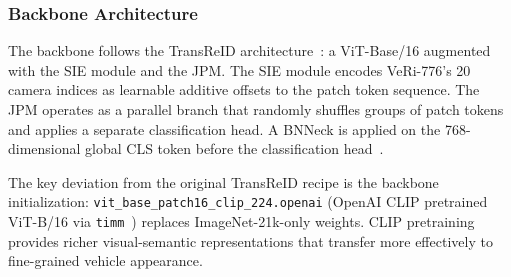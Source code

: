 \documentclass[11pt]{article}
\begin{document}
\subsubsection{Backbone Architecture}
The backbone follows the TransReID architecture~\cite{he2021transreid}: a
ViT-Base/16 augmented with the SIE module and the JPM. The SIE module
encodes VeRi-776's 20 camera indices as learnable additive offsets to the
patch token sequence. The JPM operates as a parallel branch that randomly
shuffles groups of patch tokens and applies a separate classification head.
A BNNeck is applied on the 768-dimensional global CLS token before the
classification head~\cite{he2021transreid}.

The key deviation from the original TransReID recipe is the backbone
initialization: \texttt{vit\_base\_patch16\_clip\_224.openai} (OpenAI CLIP
pretrained ViT-B/16 via \texttt{timm}~\cite{radford2021clip}) replaces
ImageNet-21k-only weights. CLIP pretraining provides richer visual-semantic
representations that transfer more effectively to fine-grained vehicle
appearance.
\end{document}
